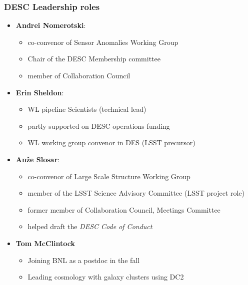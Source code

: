 \documentclass{beamer}
\begin{document}
\begin{frame}
  \frametitle{DESC Leadership roles}

  \begin{itemize}
      \item \textbf{Andrei Nomerotski}:
          \begin{itemize}
              \item co-convenor of Sensor Anomalies Working Group
              \item Chair of the DESC Membership committee
              \item member of Collaboration Council
          \end{itemize}

      \item \textbf{Erin Sheldon}:
          \begin{itemize}
              \item WL pipeline Scientists (technical lead)
              \item partly supported on DESC  operations funding
              \item WL working group convenor in DES (LSST precursor)
          \end{itemize}

      \item \textbf{An\v{z}e Slosar}: 
          \begin{itemize}
              \item co-convenor of Large Scale Structure Working Group
              \item member of the LSST Science Advisory Committee (LSST project role)
              \item former member of Collaboration Council, Meetings Committee
              \item helped draft the \emph {DESC Code of Conduct}

        \end{itemize}

    \item \textbf{Tom McClintock}
        \begin{itemize}
            \item Joining BNL as a postdoc in the fall
            \item Leading cosmology with galaxy
                clusters using DC2
        \end{itemize}


\end{itemize}

\end{frame}
\end{document}
